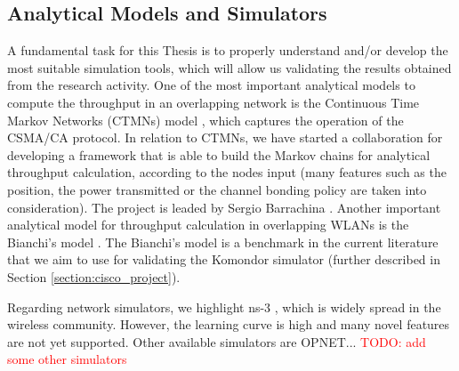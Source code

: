 \documentclass[12pt, a4paper,twoside]{tesi_upf}
\begin{document}
			\subsection{Analytical Models and Simulators}
			\label{section:validation}	
				A fundamental task for this Thesis is to properly understand and/or develop the most suitable simulation tools, which will allow us validating the results obtained from the research activity. One of the most important analytical models to compute the throughput in an overlapping network is the Continuous Time Markov Networks (CTMNs) model \cite{bellalta2014throughput}, which captures the operation of the CSMA/CA protocol. In relation to CTMNs, we have started a collaboration for developing a framework that is able to build the Markov chains for analytical throughput calculation, according to the nodes input (many features such as the position, the power transmitted or the channel bonding policy are taken into consideration). The project is leaded by Sergio Barrachina \cite{barrachina2017ctmn}. Another important analytical model for throughput calculation in overlapping WLANs is the Bianchi's model \cite{bianchi2000performance}. The Bianchi's model is a benchmark in the current literature that we aim to use for validating the Komondor simulator (further described in Section \ref{section:cisco_project}).				
				
				Regarding network simulators, we highlight ns-3 \cite{}, which is widely spread in the wireless community. However, the learning curve is high and many novel features are not yet supported. 	Other available simulators are OPNET... \textcolor{red}{TODO: add some other simulators}
				
\end{document}
